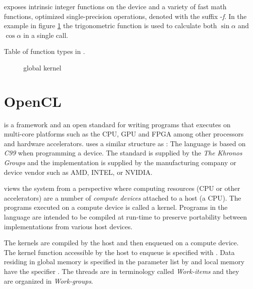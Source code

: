 {\CU} exposes intrinsic integer functions on the device and a variety of fast math functions, optimized single-precision operations, denoted with the suffix -\emph{f}. In the {\CU} example in figure \ref{lst:sample:global:cu} the trigonometric function  is used to calculate both $\sin{\alpha}$ and $\cos{\alpha}$ in a single call.

\begin{table}
	\centering
	
	\caption{Table of function types in {\CU}.}
	\label{tab:cuda:func-types}
\end{table}

\begin{figure}
	\centering
	\fbox{}
	\caption{{\CU} global kernel}
	\label{lst:sample:global:cu}	
\end{figure}

\section{OpenCL}

{\OCL} is a framework and an open standard for writing programs that executes on multi-core platforms such as the \gls{CPU}, \gls{GPU} and \gls{FPGA} among other processors and hardware accelerators. {\OCL} uses a similar structure as {\CU}: The language is based on \emph{C99} when programming a device. The standard is supplied by the \emph{The Khronos Groups} and the implementation is supplied by the manufacturing company or device vendor such as AMD, INTEL, or NVIDIA.

{\OCL} views the system from a perspective where computing resources (\gls{CPU} or other accelerators) are a number of \emph{compute devices} attached to a host (a \gls{CPU}). The programs executed on a compute device is called a kernel. Programs in the {\OCL} language are intended to be compiled at run-time to preserve portability between implementations from various host devices.

The {\OCL} kernels are compiled by the host and then enqueued on a compute device. The kernel function accessible by the host to enqueue is specified with . Data residing in global memory is specified in the parameter list by  and local memory have the specifier . The {\CU} threads are in {\OCL} terminology called \emph{Work-items} and they are organized in \emph{Work-groups}.

